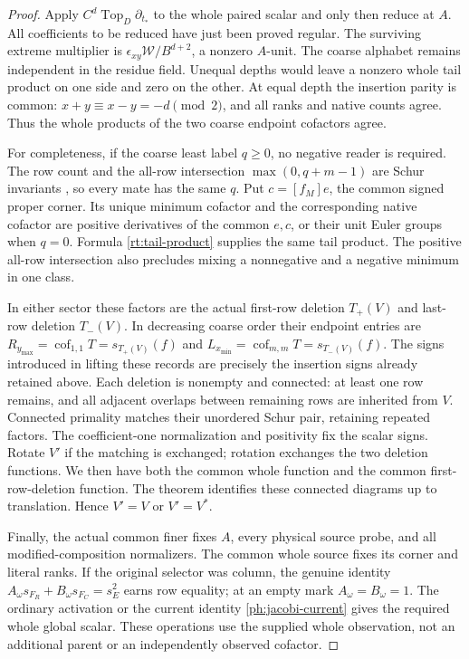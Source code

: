 \documentclass[11pt,a4paper]{amsart}
\numberwithin{equation}{section}
\theoremstyle{plain}
\theoremstyle{definition}
\begin{document}
\begin{proof}
Apply \(C^d\operatorname{Top}_D\partial_{t_*}\) to the whole
paired scalar and only then reduce at \(A\).
All coefficients to be reduced have just been proved regular.
The surviving extreme multiplier is
\(\epsilon_{xy}\mathcal W/B^{d+2}\), a nonzero \(A\)-unit.
The coarse alphabet remains independent in the residue field.
Unequal depths would leave a nonzero whole tail product on one side
and zero on the other.  At equal depth the insertion parity is common:
\(x+y\equiv x-y=-d\pmod2\), and all ranks and native counts agree.
Thus the whole products of the two coarse endpoint cofactors agree.

For completeness, if the coarse least label \(q\ge0\), no negative
reader is required.  The row count and the all-row intersection
\(\max(0,q+m-1)\) are Schur invariants
\cite{Reiner2007Coincidences}, so every mate has the
same \(q\).  Put \(c=[f_M]e\), the common signed proper corner.
Its unique minimum cofactor and the corresponding native cofactor
are positive derivatives of the common \(e,c\), or their unit
Euler groups when \(q=0\).  Formula \eqref{rt:tail-product} supplies
the same tail product.  The positive all-row intersection also
precludes mixing a nonnegative and a negative minimum in one class.

In either sector these factors are the actual first-row deletion
\(T_+(V)\) and last-row deletion \(T_-(V)\).
In decreasing coarse order their endpoint entries are
\(R_{y_{\max}}=\operatorname{cof}_{1,1}T=s_{T_+(V)}(f)\)
and \(L_{x_{\min}}=\operatorname{cof}_{m,m}T=s_{T_-(V)}(f)\).
The signs introduced in lifting these records are precisely the
insertion signs already retained above.  Each deletion is nonempty
and connected: at least one row remains, and all adjacent overlaps
between remaining rows are inherited from \(V\).
Connected primality matches their unordered Schur pair, retaining
repeated factors.  The coefficient-one normalization and positivity
fix the scalar signs.  Rotate \(V'\) if the matching is exchanged;
rotation exchanges the two deletion functions.  We then have
both the common whole function and the common first-row-deletion
function.  The theorem
\cite[Reconstruction from two boundary observations]{Shields2026SkewSchur}
identifies these connected diagrams up to translation.  Hence
\(V'=V\) or \(V'=V^*\).

Finally, the actual common finer fixes \(A\), every physical source
probe, and all modified-composition normalizers.  The common whole
source fixes its corner and literal ranks.  If the original selector
was column, the genuine identity
\(A_\omega s_{F_R}+B_\omega s_{F_C}=s_E^2\)
earns row equality; at an empty mark \(A_\omega=B_\omega=1\).
The ordinary activation or the current identity
\eqref{ph:jacobi-current} gives the required whole global scalar.
These operations use the supplied whole observation, not an additional
parent or an independently observed cofactor.
\end{proof}
\end{document}
